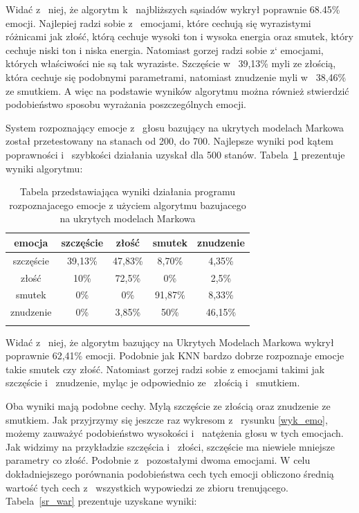 \documentclass[declaration,shortabstract]{iithesis}
\begin{document}
Widać z~ niej, że algorytm k~ najbliższych sąsiadów wykrył poprawnie 68.45\% emocji. Najlepiej radzi sobie z~ emocjami, które cechują się wyrazistymi różnicami jak złość, którą cechuje wysoki ton i wysoka energia oraz smutek, który cechuje niski ton i niska energia. Natomiast gorzej radzi sobie z` emocjami, których właściwości nie są tak wyraziste. Szczęście w~ 39,13\% myli ze złością, która cechuje się podobnymi parametrami, natomiast znudzenie myli w~ 38,46\% ze smutkiem. A więc na podstawie wyników algorytmu można również stwierdzić podobieństwo sposobu wyrażania poszczególnych emocji.

System rozpoznający emocje z~ głosu bazujący na ukrytych modelach Markowa został przetestowany na stanach od 200, do 700. Najlepsze wyniki pod kątem poprawności i~ szybkości działania uzyskał dla 500 stanów. Tabela~\ref{HMM_result} prezentuje wyniki algorytmu: 

\begin{table}[p]
\caption{Tabela przedstawiająca wyniki działania programu rozpoznajacego emocje z użyciem algorytmu bazujacego na ukrytych modelach Markowa}
\begin{center}
  \begin{tabular}{| c | c | c | c | c |}
    \hline
    emocja & szczęście & złość & smutek & znudzenie \\ \hline
    szczęście & 39,13\% & 47,83\% & 8,70\% & 4,35\% \\ \hline
	złość & 10\% & 72,5\% & 0\% & 2,5\% \\ \hline
	smutek & 0\% & 0\% & 91,87\% & 8,33\% \\ \hline
	znudzenie & 0\% & 3,85\% & 50\% & 46,15\% \\
    \hline
	\label{HMM_result}
  \end{tabular}
\end{center}
\end{table}

Widać z~ niej, że algorytm bazujący na Ukrytych Modelach Markowa wykrył poprawnie 62,41\% emocji. Podobnie jak KNN bardzo dobrze rozpoznaje emocje takie smutek czy złość. Natomiast gorzej radzi sobie z emocjami takimi jak szczęście i~ znudzenie, myląc je odpowiednio ze~ złością i~ smutkiem.

Oba wyniki mają podobne cechy. Mylą szczęście ze złością oraz znudzenie ze smutkiem. Jak przyjrzymy się jeszcze raz wykresom z~ rysunku \ref{wyk_emo}, możemy zauważyć podobieństwo wysokości i~ natężenia głosu w tych emocjach. Jak widzimy na przykładzie szczęścia i~ złości, szczęście ma niewiele mniejsze parametry co złość. Podobnie z~ pozostałymi dwoma emocjami. W celu dokładniejszego porównania podobieństwa cech tych emocji obliczono średnią wartość tych cech z~ wszystkich wypowiedzi ze zbioru trenującego. Tabela~\ref{sr_war} prezentuje uzyskane wyniki:
\end{document}
